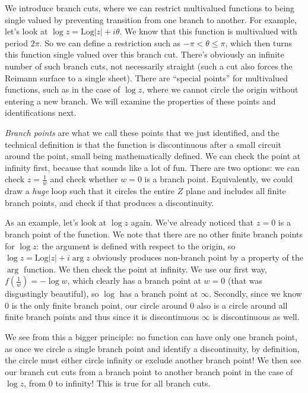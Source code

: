 \documentclass[10pt]{report}
\newcommand{\Log}[0]{\mathrm{Log} }
\begin{document}
We introduce branch cuts, where we can restrict multivalued functions to being single valued by preventing transition from one branch to another. For example, let's look at $\log z = \Log|z|+i\theta$. We know that this function is multivalued with period $2\pi$. So we can define a restriction such as $-\pi < \theta \leq \pi$, which then turns this function single valued over this branch cut. There's obviously an infinite number of such branch cuts, not necessarily straight (such a cut also forces the Reimann surface to a single sheet). There are ``special points'' for multivalued functions, such as in the case of $\log z$, where we cannot circle the origin without entering a new branch. We will examine the properties of these points and identifications next.

\emph{Branch points} are what we call these points that we just identified, and the technical definition is that the function is discontinuous after a small circuit around the point, small being mathematically defined. We can check the point at infinity first, because that sounds like a lot of fun. There are two options: we can check $z=\frac{1}{w}$ and check whether $w=0$ is a branch point. Equivalently, we could draw a \emph{huge} loop such that it circles the entire $Z$ plane and includes all finite branch points, and check if that produces a discontinuity.

As an example, let's look at $\log z$ again. We've already noticed that $z=0$ is a branch point of the function. We note that there are no other finite branch points for $\log z$: the argument is defined with respect to the origin, so $\log z = \Log|z|+i\arg z$ obviously produces non-branch point by a property of the $\arg$ function. We then check the point at infinity. We use our first way, $f\left( \frac{1}{w} \right) = -\log w$, which clearly has a branch point at $w=0$ (that was disgustingly beautiful), so $\log$ has a branch point at $\infty$.  Secondly, since we know $0$ is the only finite branch point, our circle around $0$ also is a circle around all finite branch points and thus since it is discontinuous $\infty$ is discontinuous as well.

We see from this a bigger principle: no function can have only one branch point, as once we circle a single branch point and identify a discontinuity, by definition, the circle must either circle infinity or exclude another branch point! We then see our branch cut cuts from a branch point to another branch point in the case of $\log z$, from $0$ to infinity! This is true for all branch cuts. 
\end{document}

